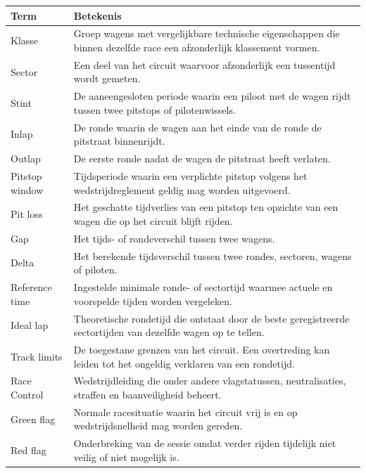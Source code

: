 \begin{tabularx}{\textwidth}{@{}lX@{}}
\toprule
\textbf{Term} & \textbf{Betekenis} \\
\midrule

Klasse &
Groep wagens met vergelijkbare technische eigenschappen die binnen dezelfde race een afzonderlijk klassement vormen. \\

Sector &
Een deel van het circuit waarvoor afzonderlijk een tussentijd wordt gemeten. \\

Stint &
De aaneengesloten periode waarin een piloot met de wagen rijdt tussen twee pitstops of pilotenwissels. \\

Inlap &
De ronde waarin de wagen aan het einde van de ronde de pitstraat binnenrijdt. \\

Outlap &
De eerste ronde nadat de wagen de pitstraat heeft verlaten. \\

Pitstop window &
Tijdsperiode waarin een verplichte pitstop volgens het wedstrijdreglement geldig mag worden uitgevoerd. \\

Pit loss &
Het geschatte tijdverlies van een pitstop ten opzichte van een wagen die op het circuit blijft rijden. \\

Gap &
Het tijds- of rondeverschil tussen twee wagens. \\

Delta &
Het berekende tijdsverschil tussen twee rondes, sectoren, wagens of piloten. \\

Reference time &
Ingestelde minimale ronde- of sectortijd waarmee actuele en voorspelde tijden worden vergeleken. \\

Ideal lap &
Theoretische rondetijd die ontstaat door de beste geregistreerde sectortijden van dezelfde wagen op te tellen. \\

Track limits &
De toegestane grenzen van het circuit. Een overtreding kan leiden tot het ongeldig verklaren van een rondetijd. \\

Race Control &
Wedstrijdleiding die onder andere vlagstatussen, neutralisaties, straffen en baanveiligheid beheert. \\

Green flag &
Normale racesituatie waarin het circuit vrij is en op wedstrijdsnelheid mag worden gereden. \\

Red flag &
Onderbreking van de sessie omdat verder rijden tijdelijk niet veilig of niet mogelijk is. \\

\bottomrule
\end{tabularx}
\endgroup

